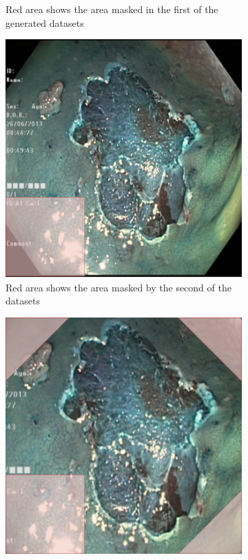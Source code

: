 \begin{figure}[h]
\begin{subfigure}[t]{0.37\textwidth}
         \caption{Red area shows the area masked in the first of the generated datasets}
         \label{fig:CornerMask}
     \end{subfigure}
     \begin{subfigure}[t]{0.37\textwidth}
         \centering
         \includegraphics[width=\textwidth]{methodology/figures/greenmask.png}
         \caption{Red area shows the area masked by the second of the datasets}
         \label{fig:GreenMask}
     \end{subfigure}     
     \hspace*{2cm}
     \begin{subfigure}[t]{0.37\textwidth}
         \centering
         \includegraphics[width=\textwidth]{methodology/figures/bothmask.png}

\end{subfigure}
\end{figure}
